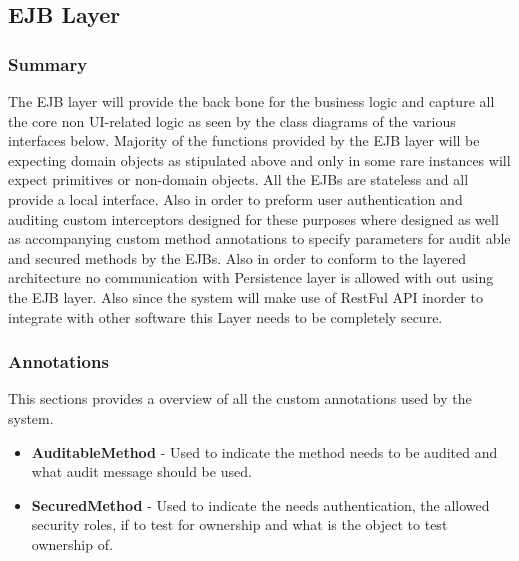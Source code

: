 \documentclass[12pt]{article}
\begin{document}
\newpage
\subsection{EJB Layer}
\subsubsection{Summary}
The EJB layer will provide the back bone for the business logic and capture all the core non UI-related logic as seen by the class diagrams of the various interfaces below. Majority of the functions provided by the EJB layer will be expecting domain objects as stipulated above and only in some rare instances will expect primitives or non-domain objects. All the EJBs are stateless and all provide a local interface. Also in order to preform user authentication and auditing custom interceptors designed for these purposes where designed as well as accompanying custom method annotations to specify parameters for audit able and secured methods by the EJBs. Also in order to conform to the layered architecture no communication with Persistence layer is allowed with out using the EJB layer. Also since the system will make use of RestFul API inorder to integrate with other software this Layer needs to be completely secure. 

\subsubsection{Annotations}
This sections provides a overview of all the custom annotations used by the system.
\begin{itemize}
	\item \textbf{AuditableMethod} - Used to indicate the method needs to be audited and what audit message should be used.
	\item \textbf{SecuredMethod} - Used to indicate the needs authentication, the allowed security roles, if to test for ownership and what is the object to test ownership of.
\end{itemize} 

\newpage
\end{document}
